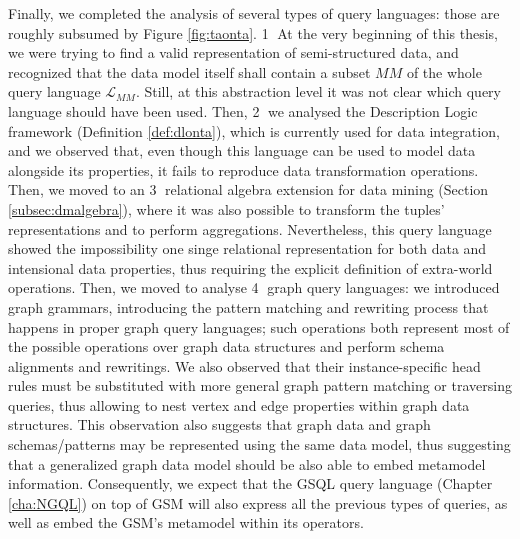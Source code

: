 Finally, we completed the analysis of several types of query languages: those are roughly subsumed by Figure \ref{fig:taonta}. \textcircled{\raisebox{-.5pt}1} At the very beginning of this thesis, we were trying to find a valid  representation of semi-structured data, and recognized that the data model itself shall contain a subset $MM$ of the whole query language $\mathcal{L}_{MM}$. Still, at this abstraction level it was not clear which query language should have been used. Then, \textcircled{\raisebox{-.5pt}2} we analysed the Description Logic framework (Definition \vref{def:dlonta}), which is currently used for data integration, and we observed that, even though this language can be used to model data alongside its properties, it fails to reproduce data transformation operations. Then, we moved to an  \textcircled{\raisebox{-.5pt}3} relational algebra extension for data mining (Section \vref{subsec:dmalgebra}), where it was also possible to transform the tuples' representations and to perform aggregations. Nevertheless, this query language showed the impossibility one singe relational representation for both data and intensional data properties, thus requiring the explicit definition of extra-world operations. Then, we moved to analyse \textcircled{\raisebox{-.5pt}4} graph query languages: we  introduced graph grammars, introducing the pattern matching and rewriting process that happens in proper graph query languages; such operations both represent most of the possible operations over graph data structures and perform schema alignments and rewritings. We also observed that their instance-specific head rules must be substituted with more general graph pattern matching or traversing queries, thus allowing to nest vertex and edge properties within graph data structures. This observation also suggests that graph data and graph schemas/patterns may be represented using the same data model, thus suggesting that a generalized graph data model should be also able to embed metamodel information. Consequently, we expect that the GSQL query language (Chapter \ref{cha:NGQL}) on top of GSM will also  express all the previous types of queries, as well as embed the GSM's metamodel within its operators.


